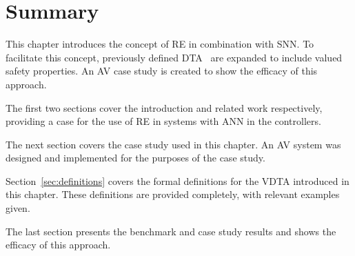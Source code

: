 \section{Summary}
This chapter introduces the concept of \acf{RE} in combination with \acf{SNN}.
To facilitate this concept, previously defined \acf{DTA}~\cite{recps} are expanded to include valued safety properties.
An \ac{AV} case study is created to show the efficacy of this approach.

The first two sections cover the introduction and related work respectively, providing a case for the use of \ac{RE} in systems with \ac{ANN} in the controllers.

The next section covers the case study used in this chapter.
An \acf{AV} system was designed and implemented for the purposes of the case study.

Section~\ref{sec:definitions} covers the formal definitions for the \ac{VDTA} introduced in this chapter.
These definitions are provided completely, with relevant examples given.

The last section presents the benchmark and case study results and shows the efficacy of this approach.
